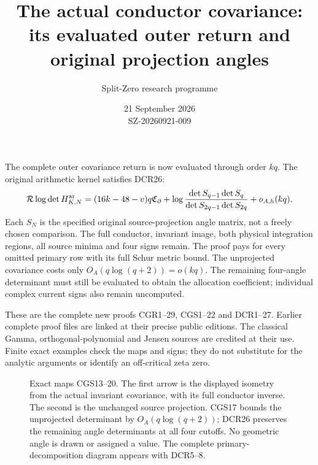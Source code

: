 \documentclass[11pt]{article}
\title{The actual conductor covariance:\\its evaluated outer return and original projection angles}
\author{Split-Zero research programme}
\date{21 September 2026\\SZ-20260921-009}
\newcommand{\C}{\mathbb C}\newcommand{\Pp}{\mathcal P}
\begin{document}
\maketitle
The complete outer covariance return is now evaluated through order
\(kq\). The original arithmetic kernel satisfies DCR26:
\[
\mathcal R\log\det H_{K,N}^{\rm ar}
=(16k-48-v)q\mathfrak C_\partial+
\log\frac{\det S_{q-1}\det S_q}{\det S_{2q-1}\det S_{2q}}
+o_{A,h}(kq).
\]
Each \(S_N\) is the specified original source-projection angle matrix,
not a freely chosen comparison. The full conductor, invariant image,
both physical integration regions, all source minima and four signs
remain. The proof pays for every omitted primary row with its full
Schur metric bound. The unprojected covariance costs only
\(O_A(q\log(q+2))=o(kq)\).
The remaining four-angle determinant must still be evaluated to obtain
the allocation coefficient; individual complex current signs also
remain uncomputed.

These are the complete new proofs CGR1--29, CGS1--22 and DCR1--27.
Earlier complete proof files are linked at their precise public editions.
The classical Gamma, orthogonal-polynomial and Jensen sources are
credited at their use. Finite exact examples check the maps and signs;
they do not substitute for the analytic arguments or identify an
off-critical zeta zero.
\tableofcontents\clearpage
\begin{figure}[ht]\centering
{}
\caption{Exact maps CGS13--20. The first arrow is the displayed isometry
from the actual invariant covariance, with its full conductor inverse.
The second is the unchanged source projection. CGS17 bounds the
unprojected determinant by \(O_A(q\log(q+2))\); DCR26 preserves the
remaining angle determinants at all four cutoffs. No geometric angle is
drawn or assigned a value. The complete primary-decomposition diagram
appears with DCR5--8.}
\end{figure}
\end{document}
